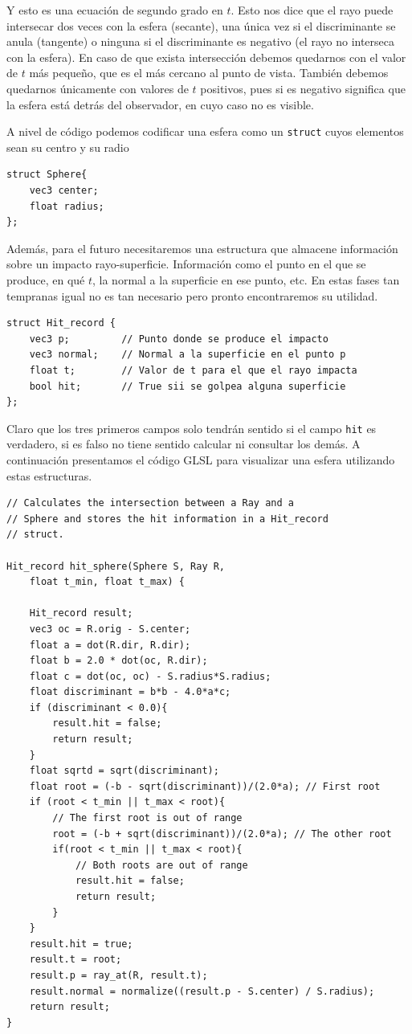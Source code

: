 Y esto es una ecuación de segundo grado en $t$. Esto nos dice que el rayo puede intersecar dos veces con la esfera (secante), una única vez si el discriminante se anula (tangente) o ninguna si el discriminante es negativo (el rayo no interseca con la esfera). En caso de que exista intersección debemos quedarnos con el valor de $t$ más pequeño, que es el más cercano al punto de vista. También debemos quedarnos únicamente con valores de $t$ positivos, pues si es negativo significa que la esfera está detrás del observador, en cuyo caso no es visible.

A nivel de código podemos codificar una esfera como un \verb|struct| cuyos elementos sean su centro y su radio

\begin{lstlisting}
struct Sphere{
    vec3 center;
    float radius;
};
\end{lstlisting}

Además, para el futuro necesitaremos una estructura que almacene información sobre un impacto rayo-superficie. Información como el punto en el que se produce, en qué $t$, la normal a la superficie en ese punto, etc. En estas fases tan tempranas igual no es tan necesario pero pronto encontraremos su utilidad.

\begin{lstlisting}
struct Hit_record {
    vec3 p;         // Punto donde se produce el impacto
    vec3 normal;    // Normal a la superficie en el punto p
    float t;        // Valor de t para el que el rayo impacta
    bool hit;       // True sii se golpea alguna superficie
};
\end{lstlisting}

Claro que los tres primeros campos solo tendrán sentido si el campo \verb|hit| es verdadero, si es falso no tiene sentido calcular ni consultar los demás. A continuación presentamos el código GLSL para visualizar una esfera utilizando estas estructuras.

\begin{lstlisting}
// Calculates the intersection between a Ray and a 
// Sphere and stores the hit information in a Hit_record 
// struct.

Hit_record hit_sphere(Sphere S, Ray R, 
    float t_min, float t_max) {

    Hit_record result;
    vec3 oc = R.orig - S.center;
    float a = dot(R.dir, R.dir);
    float b = 2.0 * dot(oc, R.dir);
    float c = dot(oc, oc) - S.radius*S.radius;
    float discriminant = b*b - 4.0*a*c;
    if (discriminant < 0.0){
        result.hit = false;
        return result;
    }
    float sqrtd = sqrt(discriminant);
    float root = (-b - sqrt(discriminant))/(2.0*a); // First root
    if (root < t_min || t_max < root){ 
        // The first root is out of range
        root = (-b + sqrt(discriminant))/(2.0*a); // The other root
        if(root < t_min || t_max < root){ 
            // Both roots are out of range
            result.hit = false;
            return result;
        }
    } 
    result.hit = true;
    result.t = root;
    result.p = ray_at(R, result.t);
    result.normal = normalize((result.p - S.center) / S.radius);
    return result;
}
\end{lstlisting}

